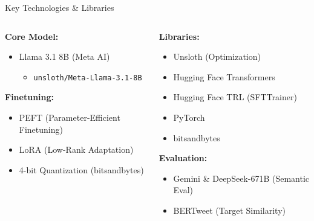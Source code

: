 \documentclass{beamer}
\begin{document}
\begin{frame}{Key Technologies & Libraries}
  \begin{columns}[T] %
    \begin{column}{0.5\textwidth}
      \textbf{Core Model:}
      \begin{itemize}
        \item Llama 3.1 8B (Meta AI)
              \begin{itemize}
                \item \texttt{unsloth/Meta-Llama-3.1-8B}
              \end{itemize}
      \end{itemize}

      \bigskip %

      \textbf{Finetuning:}
      \begin{itemize}
        \item PEFT (Parameter-Efficient Finetuning)
        \item LoRA (Low-Rank Adaptation)
        \item 4-bit Quantization (bitsandbytes)
      \end{itemize}
    \end{column}
    \begin{column}{0.5\textwidth}
      \textbf{Libraries:}
      \begin{itemize}
        \item Unsloth (Optimization)
        \item Hugging Face Transformers
        \item Hugging Face TRL (SFTTrainer)
        \item PyTorch
        \item bitsandbytes
      \end{itemize}

      \bigskip %

      \textbf{Evaluation:}
      \begin{itemize}
        \item Gemini \& DeepSeek-671B (Semantic Eval)
        \item BERTweet (Target Similarity)
      \end{itemize}
    \end{column}
  \end{columns}
\end{frame}
\end{document}
